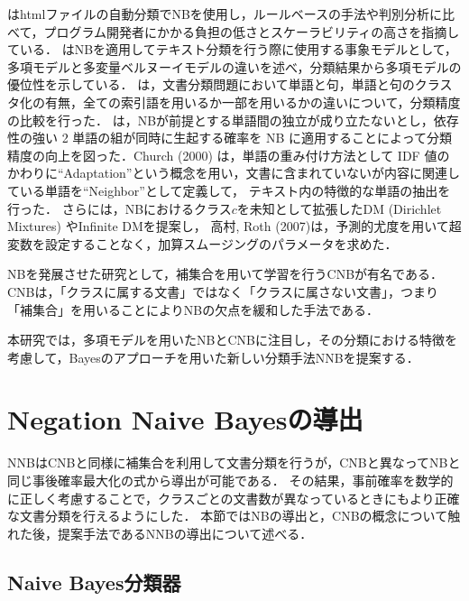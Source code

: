\documentclass[japanese]{jnlp_1.4}
\begin{document}
はhtmlファイルの自動分類でNBを使用し，ルールベースの手法や判別分析に比べて，プログラム開発者にかかる負担の低さとスケーラビリティの高さを指摘している．
はNBを適用してテキスト分類を行う際に使用する事象モデルとして，多項モデルと多変量ベルヌーイモデルの違いを述べ，分類結果から多項モデルの優位性を示している．
は，文書分類問題において単語と句，単語と句のクラスタ化の有無，全ての索引語を用いるか一部を用いるかの違いについて，分類精度の比較を行った．
は，NBが前提とする単語間の独立が成り立たないとし，依存性の強い 2 単語の組が同時に生起する確率を NB に適用することによって分類精度の向上を図った．Church (2000) は，単語の重み付け方法として IDF 値のかわりに``Adaptation''という概念を用い，文書に含まれていないが内容に関連している単語を``Neighbor''として定義して，
テキスト内の特徴的な単語の抽出を行った．
さらには，NBにおけるクラス$c$を未知として拡張したDM (Dirichlet Mixtures) やInfinite DMを提案し，
    高村, Roth (2007)\nocite{高村}は，予測的尤度を用いて超変数を設定することなく，加算スムージングのパラメータを求めた．

NBを発展させた研究として，補集合を用いて学習を行うCNBが有名である\cite{Rennie}．
CNBは，「クラスに属する文書」ではなく「クラスに属さない文書」，つまり「補集合」を用いることによりNBの欠点を緩和した手法である．

本研究では，多項モデルを用いたNBとCNBに注目し，その分類における特徴を考慮して，Bayesのアプローチを用いた新しい分類手法NNBを提案する．



\section{Negation Naive Bayesの導出} \label{Sec:Negation Naive Bayesの導出}

NNBはCNBと同様に補集合を利用して文書分類を行うが，CNBと異なってNBと同じ事後確率最大化の式から導出が可能である．
その結果，事前確率を数学的に正しく考慮することで，クラスごとの文書数が異なっているときにもより正確な文書分類を行えるようにした．
本節ではNBの導出と，CNBの概念について触れた後，提案手法であるNNBの導出について述べる．


\subsection{Naive Bayes分類器}\label{Sec:Naive Bayes分類器}
\end{document}
